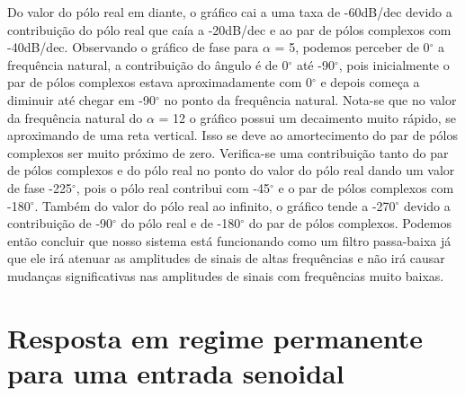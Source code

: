 \documentclass[a4paper,12pt,twoside]{article}
\begin{document}
\indent Do valor do pólo real em diante, o gráfico cai a uma taxa de -60dB/dec devido a contribuição do pólo real que caía a -20dB/dec e ao par de pólos complexos com -40dB/dec.\newline
\indent Observando o gráfico de fase para $\alpha$ = 5, podemos perceber de 0$^{\circ}$ a frequência natural, a contribuição do ângulo é de 0$^{\circ}$ até -90$^{\circ}$, pois inicialmente o par de pólos complexos estava aproximadamente com 0$^{\circ}$ e depois começa a diminuir até chegar em -90$^{\circ}$ no ponto da frequência natural. \newline
\indent Nota-se que no valor da frequência natural do $\alpha$ = 12 o gráfico possui um decaimento muito rápido, se aproximando de uma reta vertical. Isso se deve ao amortecimento do par de pólos complexos ser muito próximo de zero.\newline
\indent Verifica-se uma contribuição tanto do par de pólos complexos e do pólo real no ponto do valor do pólo real dando um valor de fase -225$^{\circ}$, pois o pólo real contribui com -45$^{\circ}$ e o par de pólos complexos com -180$^{\circ}$.  \newline
\indent Também do valor do pólo real ao infinito, o gráfico tende a -270$^{\circ}$ devido a contribuição de -90$^{\circ}$ do pólo real e de -180$^{\circ}$ do par de pólos complexos. \newline
\indent Podemos então concluir que nosso sistema está funcionando como um filtro passa-baixa já que ele irá atenuar as amplitudes de sinais de altas frequências e não irá causar mudanças significativas nas amplitudes de sinais com frequências muito baixas. 







\section{Resposta em regime permanente para uma entrada senoidal}

\end{document}
